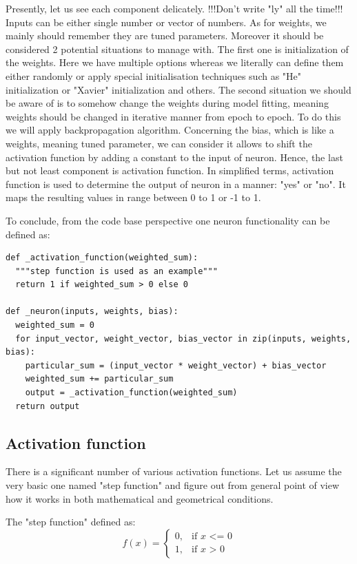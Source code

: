 Presently, let us see each component delicately. !!!Don't write "ly" all the time!!!
Inputs can be either single number or vector of numbers. As for weights, we mainly should remember they are tuned parameters. Moreover it should be considered 2 potential situations to manage with. The first one is initialization of the weights. Here we have multiple options whereas we literally can define them either randomly or apply special initialisation techniques such as "He" initialization or "Xavier" initialization and others. The second situation we should be aware of is to somehow change the weights during model fitting, meaning weights should be changed in iterative manner from epoch to epoch. To do this we will apply backpropagation algorithm. Concerning the bias, which is like a weights, meaning tuned parameter, we can consider it allows to shift the activation function by adding a constant to the input of neuron. Hence, the last but not least component is activation function. In simplified terms, activation function is used to determine the output of neuron in a manner: "yes" or "no". It maps the resulting values in range between 0 to 1 or -1 to 1.            

To conclude, from the code base perspective one neuron functionality can be defined as:
\begin{lstlisting}
def _activation_function(weighted_sum):
  """step function is used as an example"""
  return 1 if weighted_sum > 0 else 0

def _neuron(inputs, weights, bias):
  weighted_sum = 0
  for input_vector, weight_vector, bias_vector in zip(inputs, weights, bias):
    particular_sum = (input_vector * weight_vector) + bias_vector
    weighted_sum += particular_sum
    output = _activation_function(weighted_sum)
  return output
\end{lstlisting}

      
\subsection{Activation function}
There is a significant number of various activation functions. Let us assume the very basic one named "step function" and figure out from general point of view how it works in both mathematical and geometrical conditions.   

The "step function" defined as:
\[ f(x) = \begin{cases} 0, & \mbox{if } x\mbox{ <= 0} \\ 1, & \mbox{if } x\mbox{ > 0} \end{cases} \]

